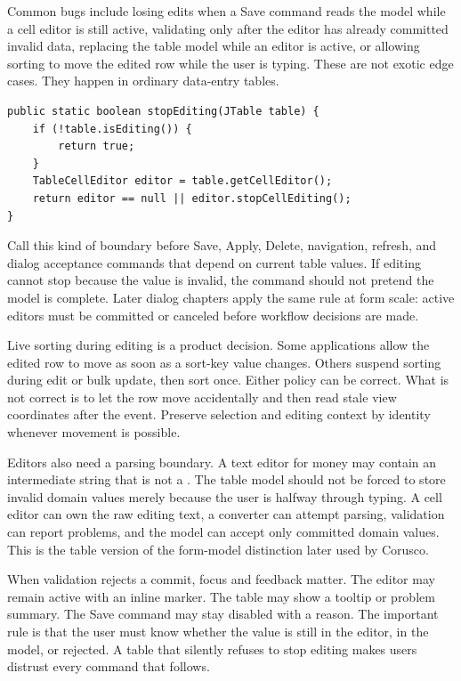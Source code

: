 Common bugs include losing edits when a Save command reads the model while a cell editor is still active, validating only after the editor has already committed invalid data, replacing the table model while an editor is active, or allowing sorting to move the edited row while the user is typing. These are not exotic edge cases. They happen in ordinary data-entry tables.

\begin{lstlisting}[caption={Stop active editing before executing a command that reads table data.}]
public static boolean stopEditing(JTable table) {
    if (!table.isEditing()) {
        return true;
    }
    TableCellEditor editor = table.getCellEditor();
    return editor == null || editor.stopCellEditing();
}
\end{lstlisting}

Call this kind of boundary before Save, Apply, Delete, navigation, refresh, and dialog acceptance commands that depend on current table values. If editing cannot stop because the value is invalid, the command should not pretend the model is complete. Later dialog chapters apply the same rule at form scale: active editors must be committed or canceled before workflow decisions are made.

Live sorting during editing is a product decision. Some applications allow the edited row to move as soon as a sort-key value changes. Others suspend sorting during edit or bulk update, then sort once. Either policy can be correct. What is not correct is to let the row move accidentally and then read stale view coordinates after the event. Preserve selection and editing context by identity whenever movement is possible.

Editors also need a parsing boundary. A text editor for money may contain an intermediate string that is not a . The table model should not be forced to store invalid domain values merely because the user is halfway through typing. A cell editor can own the raw editing text, a converter can attempt parsing, validation can report problems, and the model can accept only committed domain values. This is the table version of the form-model distinction later used by Corusco.

When validation rejects a commit, focus and feedback matter. The editor may remain active with an inline marker. The table may show a tooltip or problem summary. The Save command may stay disabled with a reason. The important rule is that the user must know whether the value is still in the editor, in the model, or rejected. A table that silently refuses to stop editing makes users distrust every command that follows.

